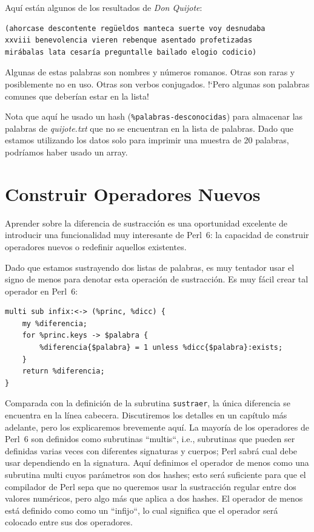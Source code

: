 Aquí están algunos de los resultados de {\em Don Quijote}:

\begin{verbatim}
(ahorcase descontente regüeldos manteca suerte voy desnudaba 
xxviii benevolencia vieren rebenque asentado profetizadas 
mirábalas lata cesaría preguntalle bailado elogio codicio)
\end{verbatim}
%
Algunas de estas palabras son nombres y números romanos. Otras
son raras y posiblemente no en uso. Otras son verbos conjugados.
!`Pero algunas son palabras comunes que deberían  estar en la lista!

Nota que aquí he usado un hash (\verb|%palabras-desconocidas|) para almacenar las 
palabras de \emph{quijote.txt} que no se encuentran en la lista de palabras.
Dado que estamos utilizando los datos solo para imprimir una muestra de 20 palabras,
podríamos haber usado un array.

\section{Construir Operadores Nuevos}

\label{operator_construction}

Aprender sobre la diferencia de sustracción es una oportunidad
excelente de introducir una funcionalidad muy interesante de Perl~6:
la capacidad de construir operadores nuevos o redefinir aquellos existentes.

Dado que estamos sustrayendo dos listas de palabras, es muy tentador usar
el signo de menos para denotar esta operación de sustracción. Es muy fácil 
crear tal operador en Perl~6:

\begin{verbatim}
multi sub infix:<-> (%princ, %dicc) {
	my %diferencia;
	for %princ.keys -> $palabra {
		%diferencia{$palabra} = 1 unless %dicc{$palabra}:exists;
	}
	return %diferencia;
}
\end{verbatim}


Comparada con la definición de la subrutina {\tt sustraer}, la
única diferencia se encuentra en la línea cabecera. Discutiremos
los detalles en un capítulo más adelante, pero los explicaremos
brevemente aquí. La mayoría de los operadores de Perl~6 son definidos
como subrutinas ``multis``, i.e., subrutinas que pueden ser definidas
varias veces con diferentes signaturas y cuerpos; Perl sabrá cual debe usar
dependiendo en la signatura. Aquí definimos el operador de menos como
una subrutina multi cuyos parámetros son dos hashes; esto será 
suficiente para que el compilador de Perl sepa que no queremos usar
la sustracción regular entre dos valores numéricos, pero algo más que
aplica a dos hashes. El operador de menos está definido como como un ``infijo``,
lo cual significa que el operador será colocado entre sus dos
operadores.

